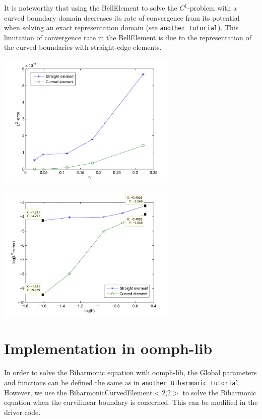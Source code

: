 It is noteworthy that using the {\ttfamily Bell\+Element} to solve the $ C^1 $-\/problem with a curved boundary domain decreases its rate of convergence from its potential when solving an exact representation domain (see \href{../../../c1_element/bell_element/html/index.html}{\tt another tutorial}). This limitation of convergence rate in the {\ttfamily Bell\+Element} is due to the representation of the curved boundaries with straight-\/edge elements.

 
\begin{DoxyImage}
\includegraphics[width=0.65\textwidth]{Rate_of_convergence_compare}
\end{DoxyImage}


 
\begin{DoxyImage}
\includegraphics[width=0.65\textwidth]{Rate_of_convergence_compare_logplot}
\end{DoxyImage}




 

\hypertarget{index_impl}{}\section{Implementation in oomph-\/lib}\label{index_impl}
In order to solve the Biharmonic equation with {\ttfamily oomph-\/lib}, the Global parameters and functions can be defined the same as in \href{../../../c1_element/bell_element/html/index.html}{\tt another Biharmonic tutorial}. However, we use the {\ttfamily Biharmonic\+Curved\+Element$<$2,2$>$} to solve the Biharmonic equation when the curvilinear boundary is concerned. This can be modified in the driver code.

